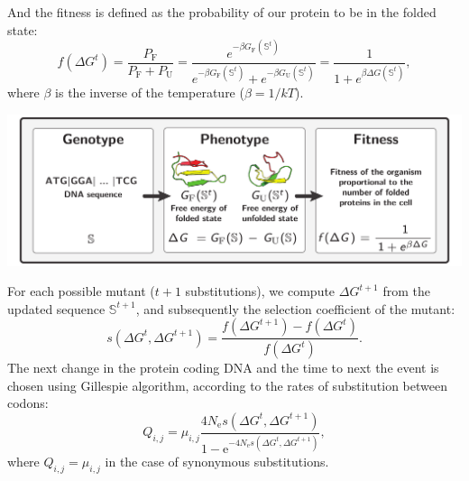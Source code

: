 \documentclass{article}
\newcommand{\e}{\mathrm{e}}
\newcommand{\Ne}{N_{\mathrm{e}}}
\newcommand{\ci}{{i}}
\newcommand{\cj}{{j}}
\newcommand{\itoj}{\ci, \cj}
\newcommand{\submatrix}{Q}
\begin{document}
And the fitness is defined as the probability of our protein to be in the folded state: 
\begin{equation}
f(\Delta G^{t}) = \dfrac{P_{\mathrm{F}}}{P_{\mathrm{F}} + P_{\mathrm{U}}} = \dfrac{e^{-\beta G_{\mathrm{F}}(\mathbb{S}^t) }}{e^{-\beta G_{\mathrm{F}} (\mathbb{S}^t) } + e^{-\beta G_{\mathrm{U}}(\mathbb{S}^t) }} = \dfrac{1}{1 + e^{\beta \Delta G(\mathbb{S}^t) }}, 
\end{equation}
where $\beta$ is the inverse of the temperature ($\beta=1/kT$).
\begin{center}
	\includegraphics[width=165mm] {artworks/ModelSimuFold.pdf}
\end{center}
For each possible mutant ($t+1$ substitutions), we compute $\Delta G^{t+1}$ from the updated sequence $\mathbb{S}^{t+1}$, and subsequently the selection coefficient of the mutant:
\begin{equation}
s \left( \Delta G^{t}, \Delta G^{t+1} \right) = \dfrac{f(\Delta G^{t+1}) - f(\Delta G^{t})}{f(\Delta G^{t})}.
\end{equation}
The next change in the protein coding DNA and the time to next the event is chosen using Gillespie algorithm, according to the rates of substitution between codons:
\begin{equation}
{\submatrix_{\itoj}} = \mu_{\itoj} \dfrac{4 \Ne s \left( \Delta G^{t}, \Delta G^{t+1} \right)}{{1 - \e^{-4 \Ne s \left( \Delta G^{t}, \Delta G^{t+1} \right)} }}, 
\end{equation}
where ${\submatrix_{\itoj}} = \mu_{\itoj}$ in the case of synonymous substitutions.
\end{document}
